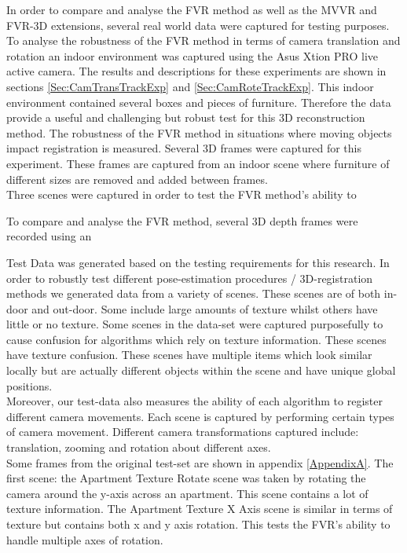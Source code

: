 
In order to compare and analyse the FVR method as well as the MVVR and FVR-3D extensions, several real world data were captured for testing purposes. To analyse the robustness of the FVR method in terms of camera translation and rotation an indoor environment was captured using the Asus Xtion PRO live active camera. The results and descriptions for these experiments are shown in sections \ref{Sec:CamTransTrackExp} and \ref{Sec:CamRoteTrackExp}. This indoor environment contained several boxes and pieces of furniture. Therefore the data provide a useful and challenging but robust test for this 3D reconstruction method. The robustness of the FVR method in situations where moving objects impact registration is measured. Several 3D frames were captured for this experiment. These frames are captured from an indoor scene where furniture of different sizes are removed and added between frames. \\

Three scenes were captured in order to test the FVR method's ability to 

To compare and analyse the FVR method, several 3D depth frames were recorded using an 

Test Data was generated based on the testing requirements for this research. In order to robustly test different pose-estimation procedures / 3D-registration methods we generated data from a variety of scenes. These scenes are of both in-door and out-door. Some include large amounts of texture whilst others have little or no texture. Some scenes in the data-set were captured purposefully to cause confusion for algorithms which rely on texture information. These scenes have texture confusion. These scenes have multiple items which look similar locally but are actually different objects within the scene and have unique global positions. \\

Moreover, our test-data also measures the ability of each algorithm to register different camera movements. Each scene is captured by performing certain types of camera movement. Different camera transformations captured include: translation, zooming and rotation about different axes. \\

Some frames from the original test-set are shown in appendix \ref{AppendixA}. The first scene: the Apartment Texture Rotate scene was taken by rotating the camera around the y-axis across an apartment. This scene contains a lot of texture information. The Apartment Texture X Axis scene is similar in terms of texture but contains both x and y axis rotation. This tests the FVR's ability to handle multiple axes of rotation. \\

